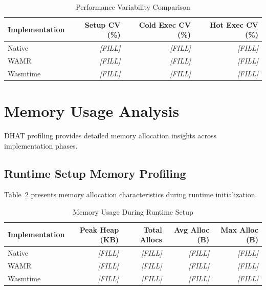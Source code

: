 \begin{table}[htbp]
\centering
\caption{Performance Variability Comparison}
\label{tab:variability-analysis}
\begin{tabular}{lrrr}
\toprule
\textbf{Implementation} & \textbf{Setup CV (\%)} & \textbf{Cold Exec CV (\%)} & \textbf{Hot Exec CV (\%)} \\
\midrule
Native       & \textit{[FILL]} & \textit{[FILL]} & \textit{[FILL]} \\
WAMR         & \textit{[FILL]} & \textit{[FILL]} & \textit{[FILL]} \\
Wasmtime     & \textit{[FILL]} & \textit{[FILL]} & \textit{[FILL]} \\
\bottomrule
\end{tabular}
\end{table}

\section{Memory Usage Analysis}
\label{sec:memory-analysis}

DHAT profiling provides detailed memory allocation insights across implementation phases.

\subsection{Runtime Setup Memory Profiling}
\label{subsec:memory-setup}

Table~\ref{tab:memory-setup} presents memory allocation characteristics during runtime initialization.

\begin{table}[htbp]
\centering
\caption{Memory Usage During Runtime Setup}
\label{tab:memory-setup}
\begin{tabular}{lrrrr}
\toprule
\textbf{Implementation} & \textbf{Peak Heap (KB)} & \textbf{Total Allocs} & \textbf{Avg Alloc (B)} & \textbf{Max Alloc (B)} \\
\midrule
Native        & \textit{[FILL]} & \textit{[FILL]} & \textit{[FILL]} & \textit{[FILL]} \\
WAMR          & \textit{[FILL]} & \textit{[FILL]} & \textit{[FILL]} & \textit{[FILL]} \\
Wasmtime      & \textit{[FILL]} & \textit{[FILL]} & \textit{[FILL]} & \textit{[FILL]} \\
\bottomrule
\end{tabular}
\end{table}

